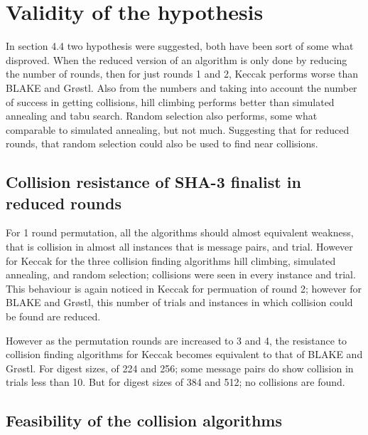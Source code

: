 
\section{Validity of the hypothesis}

In section 4.4 two hypothesis were suggested, both have been sort of some what disproved. When the reduced version
of an algorithm is only done by reducing the number of rounds, then for just rounds 1 and 2, Keccak performs worse
than BLAKE and Gr{\o}stl. Also from the numbers and taking into account the number of success in getting collisions,
hill climbing performs better than simulated annealing and tabu search. Random selection also performs, some what 
comparable to simulated annealing, but not much. Suggesting that for reduced rounds, that random selection could
also be used to find near collisions.


\subsection{Collision resistance of SHA-3 finalist in reduced rounds}

For 1 round permutation, all the algorithms should almost equivalent weakness, that is collision in almost all instances
that is message pairs, and trial. However for Keccak for the three collision finding algorithms hill climbing, simulated
annealing, and random selection; collisions were seen in every instance and trial. This behaviour is again noticed
in Keccak for permuation of round 2; however for BLAKE and Gr{\o}stl, this number of trials and instances in which
collision could be found are reduced.

However as the permutation rounds are increased to 3 and 4, the resistance to collision finding algorithms for Keccak
becomes equivalent to that of BLAKE and Gr{\o}stl. For digest sizes, of 224 and 256; some message pairs do show
collision in trials less than 10. But for digest sizes of 384 and 512; no collisions are found.

\subsection{Feasibility of the collision algorithms}

